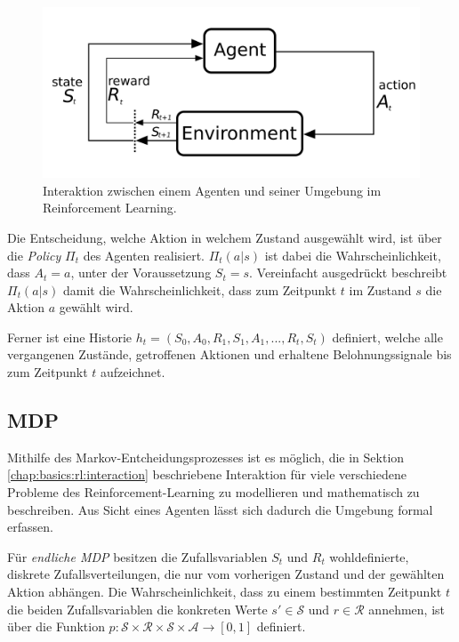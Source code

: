 		\begin{figure}[ht!]
			\centering
			\includegraphics[scale=0.2]{Bilder/markov_diagram}
			\caption{Interaktion zwischen einem Agenten und seiner Umgebung im Reinforcement Learning.}
			\label{fig.basics:rl:mdp}
		\end{figure}
	
		Die Entscheidung, welche Aktion in welchem Zustand ausgewählt wird, ist über die \textit{Policy} $\Pi_t$ des Agenten realisiert. $\Pi_t(a | s)$ ist dabei die Wahrscheinlichkeit, dass $A_t = a$, unter der Voraussetzung $S_t = s$. Vereinfacht ausgedrückt beschreibt $\Pi_t(a | s)$ damit die Wahrscheinlichkeit, dass zum Zeitpunkt $t$ im Zustand $s$ die Aktion $a$ gewählt wird.
		
		Ferner ist eine Historie $h_t = (S_0, A_0, R_1, S_1, A_1, ..., R_t, S_t)$ definiert, welche alle vergangenen Zustände, getroffenen Aktionen und erhaltene Belohnungssignale bis zum Zeitpunkt $t$ aufzeichnet.
		
		\FloatBarrier

	\subsection{\acf{MDP}}
		
		Mithilfe des Markov-Entcheidungsprozesses ist es möglich, die in Sektion \ref{chap:basics:rl:interaction} beschriebene Interaktion für viele verschiedene Probleme des Reinforcement-Learning zu modellieren und mathematisch zu beschreiben. Aus Sicht eines Agenten lässt sich dadurch die Umgebung formal erfassen.
		
		Für \textit{endliche MDP} besitzen die Zufallsvariablen $S_t$ und $R_t$ wohldefinierte, diskrete Zufallsverteilungen, die nur vom vorherigen Zustand und der gewählten Aktion abhängen.
		Die Wahrscheinlichkeit, dass zu einem bestimmten Zeitpunkt $t$ die beiden Zufallsvariablen die konkreten Werte $s' \in \mathcal{S}$ und $r \in \mathcal{R}$ annehmen, ist über die Funktion $p: \mathcal{S} \times \mathcal{R} \times \mathcal{S} \times \mathcal{A} \rightarrow [0, 1]$ definiert.
		
